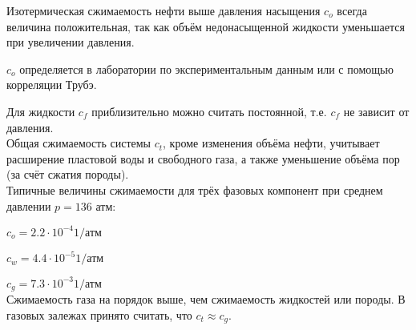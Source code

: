 Изотермическая сжимаемость нефти выше давления насыщения $c_o$ всегда величина положительная, так как объём недонасыщенной жидкости уменьшается при увеличении давления.

$c_o$ определяется в лаборатории по экспериментальным данным или с помощью корреляции Трубэ.

Для жидкости $c_f$ приблизительно можно считать постоянной, т.е. $c_f$ не зависит от давления.
\\

Общая сжимаемость системы $c_t$, кроме изменения объёма нефти, учитывает расширение пластовой воды и свободного газа, а также уменьшение объёма пор (за счёт сжатия породы).
\\

Типичные величины сжимаемости для трёх фазовых компонент при среднем давлении $p=136\text{ атм}$:

$c_o=2.2\cdot 10^{-4} 1/\text{атм}$

$c_w=4.4\cdot 10^{-5} 1/\text{атм}$

$c_g=7.3\cdot 10^{-3} 1/\text{атм}$
\\

Сжимаемость газа на порядок выше, чем сжимаемость жидкостей или породы.
В газовых залежах принято считать, что $c_t\approx c_g$.



